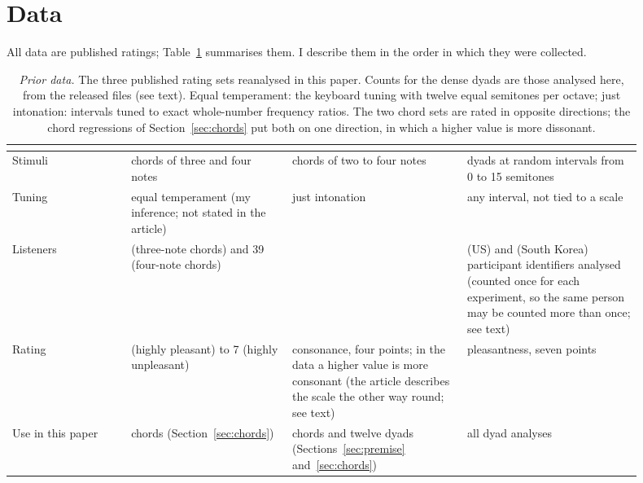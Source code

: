 \documentclass[11pt,a4paper]{article}
\begin{document}
\section{Data}
\label{sec:data}

All data are published ratings; Table~\ref{tab:datasets} summarises them. I describe them in
the order in which they were collected.

\begin{table}[t]
\centering
\caption{\emph{Prior data.} The three published rating sets reanalysed in this paper. Counts
for the dense dyads are those analysed here, from the released files (see text). Equal temperament: the
keyboard tuning with twelve equal semitones per octave; just intonation: intervals tuned to
exact whole-number frequency ratios. The two chord sets are rated in opposite directions; the
chord regressions of Section~\ref{sec:chords} put both on one direction, in which a higher
value is more dissonant.}
\label{tab:datasets}
\small
\begin{tabular}{@{}>{\raggedright\arraybackslash}p{0.17\linewidth}>{\raggedright\arraybackslash}p{0.23\linewidth}>{\raggedright\arraybackslash}p{0.25\linewidth}>{\raggedright\arraybackslash}p{0.25\linewidth}@{}}
\toprule
& \citet{johnsonlaird2012} & \citet{bowling2018} & \citet{marjieh2024} \\
\midrule
Stimuli & 103 chords of three and four notes & 298 chords of two to four notes & dyads at
random intervals from 0 to 15 semitones \\
Tuning & equal temperament (my inference; not stated in the article) & just intonation & any interval, not tied to a scale \\
Listeners & 27 (three-note chords) and 39 (four-note chords) & 30 & \nUSListeners{} (US) and \nKRListeners{} (South Korea)
participant identifiers analysed (counted once for each experiment, so the same person may be counted more than once; see text) \\
Rating & 1 (highly pleasant) to 7 (highly unpleasant) & consonance, four points; in the data a higher value is more consonant (the article describes the scale the other way round; see text) & pleasantness, seven points \\
Use in this paper & chords (Section~\ref{sec:chords}) & chords and twelve dyads
(Sections~\ref{sec:premise} and~\ref{sec:chords}) & all dyad analyses \\
\bottomrule
\end{tabular}
\end{table}
\end{document}
